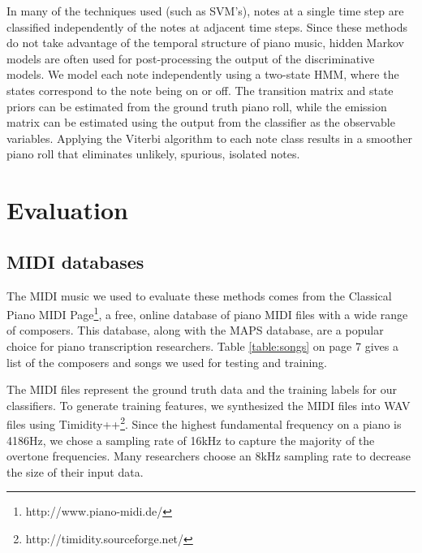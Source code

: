 \documentclass[5p]{elsarticle}
\begin{document}
In many of the techniques used (such as SVM's), notes at a single time step are classified independently of the notes at adjacent time steps. Since these methods do not take advantage of the temporal structure of piano music, hidden Markov models are often used for post-processing the output of the discriminative models. We model each note independently using a two-state HMM, where the states correspond to the note being on or off. The transition matrix and state priors can be estimated from the ground truth piano roll, while the emission matrix can be estimated using the output from the classifier as the observable variables. Applying the Viterbi algorithm to each note class results in a smoother piano roll that eliminates unlikely, spurious, isolated notes.






\section{Evaluation}

\subsection{MIDI databases}

The MIDI music we used to evaluate these methods comes from the Classical Piano MIDI Page\footnote{http://www.piano-midi.de/}, a free, online database of piano MIDI files with a wide range of composers. This database, along with the MAPS database, are a popular choice for piano transcription researchers. Table \ref{table:songs} on page 7 gives a list of the composers and songs we used for testing and training.

The MIDI files represent the ground truth data and the training labels for our classifiers. To generate training features, we synthesized the MIDI files into WAV files using Timidity++\footnote{http://timidity.sourceforge.net/}. Since the highest fundamental frequency on a piano is 4186Hz, we chose a sampling rate of 16kHz to capture the majority of the overtone frequencies. Many researchers choose an 8kHz sampling rate to decrease the size of their input data.
\end{document}

